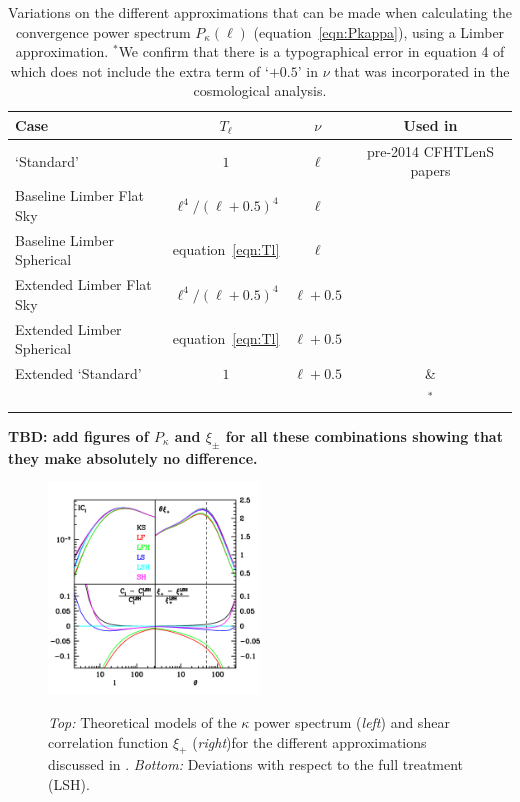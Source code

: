  \begin{table}[htb]
\label{tab:Tl_nu}
\begin{center}
\begin{tabular}{ | l | c | c  | c |}
\hline
Case & $T_\ell$ & $\nu$ & Used in \\ \hline
\citet{kitching/etal:2016} `Standard' & $1$ & $\ell$ & pre-2014 CFHTLenS papers \\
Baseline Limber Flat Sky &  $\ell^4 / (\ell + 0.5)^4$ & $\ell$ & \\
Baseline Limber Spherical & equation~\ref{eqn:Tl} & $\ell$ & \\
Extended Limber Flat Sky & $\ell^4 / (\ell + 0.5)^4$ & $\ell + 0.5$ & \\
Extended Limber Spherical & equation~\ref{eqn:Tl}& $\ell + 0.5$  & \\
Extended `Standard' & $1$ & $\ell + 0.5$ & \citet{joudaki/etal:2016} \&  \\
  & & & \citet{hildebrandt/etal:2016}$^*$\\\hline
 \end{tabular}
 \end{center}
 \caption{Variations on the different approximations that can be made when calculating the convergence power spectrum $P_\kappa(\ell)$ (equation~\ref{eqn:Pkappa}), using a Limber approximation.  $^*$We confirm that there is a typographical error in equation 4 of \citet{hildebrandt/etal:2016} which does not include the extra term of `$+0.5$' in $\nu$ that was incorporated in the cosmological analysis.}  
 \end{table}

{\bf TBD: add figures of $P_\kappa$ and $\xi_\pm$ for all these combinations showing that they make absolutely no difference.}
 
 \begin{figure}
 \begin{center}
 \includegraphics[width=0.5\textwidth]{figures/Cl_xi_comp.pdf}
 \label{fig:Cl_xi}
 \caption{\emph{Top:} Theoretical models of the $\kappa$ power spectrum (\emph{left}) and shear correlation function $\xi_+$ (\emph{right})for the different approximations discussed in \citet{kitching/etal:2016}. \emph{Bottom:} Deviations with respect to the full treatment (LSH). }
 \end{center}
 \end{figure}
 
